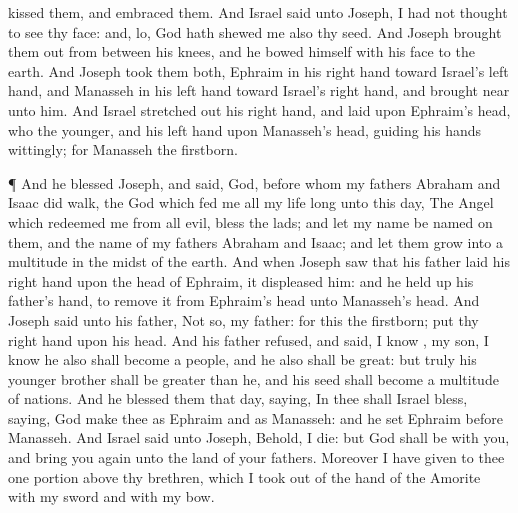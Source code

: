 {kissed them, and
embraced them.
And
Israel
said unto
Joseph, I had not
thought to
see thy
face: and, lo,
God hath
shewed me also thy
seed.
And
Joseph brought them
out from
between his
knees, and he
bowed himself with his
face to the
earth.
And
Joseph
took them
both,
Ephraim in his right
hand toward
Israel’s left
hand, and
Manasseh in his left
hand toward
Israel’s right
hand, and brought
{}
near unto him.
And
Israel stretched
out his right
hand, and
laid
{} upon
Ephraim’s
head, who
{} the
younger, and his left
hand upon
Manasseh’s
head,
guiding his
hands
wittingly; for
Manasseh
{} the
firstborn.
\par }{\PP {}¶ And he
blessed
Joseph, and
said,
God,
before whom my
fathers
Abraham and
Isaac did
walk, the
God which
fed me all my life
long unto this
day,
The
Angel which
redeemed me from all
evil,
bless the
lads; and let my
name be
named on them, and the
name of my
fathers
Abraham and
Isaac; and let them
grow into a
multitude in the
midst of the
earth.
And when
Joseph
saw that his
father
laid his
right
hand upon the
head of
Ephraim, it
displeased him: and he held
up his
father’s
hand, to
remove it from
Ephraim’s
head unto
Manasseh’s
head.
And
Joseph
said unto his
father, Not so, my
father: for this
{} the
firstborn;
put thy right
hand upon his
head.
And his
father
refused, and
said, I
know
{}, my
son, I
know
{} he also shall become a
people, and he also shall be
great: but
truly his
younger
brother shall be
greater than he, and his
seed shall become a
multitude of
nations.
And he
blessed them that
day,
saying, In thee shall
Israel
bless,
saying,
God
make thee as
Ephraim and as
Manasseh: and he
set
Ephraim
before
Manasseh.
And
Israel
said unto
Joseph, Behold, I
die: but
God shall be with you, and bring you
again unto the
land of your
fathers.
Moreover I have
given to thee
one
portion above thy
brethren, which I
took out of the
hand of the
Amorite with my
sword and with my
bow.

}

